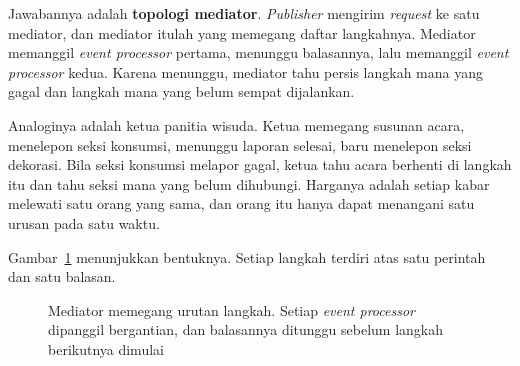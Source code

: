 Jawabannya adalah \textbf{topologi mediator}. \textit{Publisher} mengirim \textit{request} ke
satu mediator, dan mediator itulah yang memegang daftar langkahnya. Mediator
memanggil \textit{event processor} pertama, menunggu balasannya, lalu memanggil \textit{event processor} kedua.
Karena menunggu, mediator tahu persis langkah mana yang gagal dan langkah mana
yang belum sempat dijalankan.

Analoginya adalah ketua panitia wisuda. Ketua memegang susunan acara, menelepon
seksi konsumsi, menunggu laporan selesai, baru menelepon seksi dekorasi. Bila
seksi konsumsi melapor gagal, ketua tahu acara berhenti di langkah itu dan tahu
seksi mana yang belum dihubungi. Harganya adalah setiap kabar melewati satu
orang yang sama, dan orang itu hanya dapat menangani satu urusan pada satu
waktu.

Gambar~\ref{fig:bintang-mediator} menunjukkan bentuknya. Setiap langkah
terdiri atas satu perintah dan satu balasan.

\begin{figure}[htbp]
  \centering
  \caption{Mediator memegang urutan langkah. Setiap \textit{event processor} dipanggil
    bergantian, dan balasannya ditunggu sebelum langkah berikutnya dimulai}
  \label{fig:bintang-mediator}
\end{figure}

